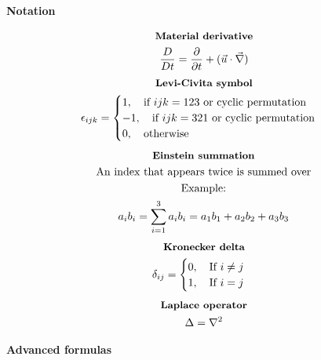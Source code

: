 \documentclass[10pt, a4paper]{article}
\newcommand{\derivative}[2]{\frac{\partial #1}{\partial #2}}
\begin{document}
\begin{center}
    \Large
    \textbf{Notation}
    \vspace{0.5cm}
\end{center}
\begin{multicols*}{1}
    \begin{gather*}
        \textbf{\small Material derivative} \\
        \frac{D}{Dt} = \derivative{}{t} + (\vec{u}\cdot \vec{\nabla})
    \end{gather*}
    \begin{gather*}
        \textbf{\small Levi-Civita symbol} \\
        \epsilon_{ijk} = 
        \begin{cases}
            1, \quad \text{if $ijk = 123$ or cyclic permutation} \\
            -1, \quad \text{if $ijk = 321$ or cyclic permutation} \\
            0, \quad \text{otherwise}
        \end{cases}
    \end{gather*}
    \begin{gather*}
        \textbf{\small Einstein summation} \\
        \text{An index that appears twice is summed over} \\
        \text{Example:} \\
        a_i b_i = \sum_{i=1}^3 a_i b_i = a_1 b_1 + a_2 b_2 + a_3 b_3
    \end{gather*}
    \begin{gather*}
        \textbf{\small Kronecker delta} \\
        \delta_{ij} = 
        \begin{cases}
            0, \quad \text{If $i \neq j$} \\
            1, \quad \text{If $i = j$}
        \end{cases}
    \end{gather*}
    \begin{gather*}
        \textbf{\small Laplace operator} \\
        \Delta = \nabla^2
    \end{gather*}
\end{multicols*}
\begin{center}
    \Large
    \textbf{Advanced formulas}
    \vspace{0.5cm}
\end{center}
\end{document}
